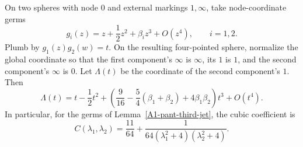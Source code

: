 \begin{lemma}
\label{A1-four-point-plumbing-jet}
On two spheres with node $0$ and external markings $1,\infty$,
take node-coordinate germs
\[
 g_i(z)=z+\frac12z^2+\beta_i z^3+O(z^4),\qquad i=1,2.
\]
Plumb by $g_1(z)g_2(w)=t$. On the resulting four-pointed sphere,
normalize the global coordinate so that the first component's
$\infty$ is $\infty$, its $1$ is $1$, and the second component's
$\infty$ is $0$. Let $\Lambda(t)$ be the coordinate of the second
component's $1$. Then
\[
 \Lambda(t)=t-\frac12t^2+
 \left(\frac9{16}-\frac54(\beta_1+\beta_2)
                         +4\beta_1\beta_2\right)t^3+O(t^4).
\]
In particular, for the germs of Lemma~\ref{A1-pant-third-jet},
the cubic coefficient is
\[
 C(\lambda_1,\lambda_2)
   =\frac{11}{64}
       +\frac1{64(\lambda_1^2+4)(\lambda_2^2+4)}.
\]
\end{lemma}
